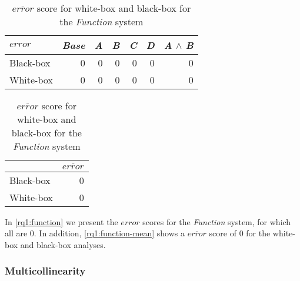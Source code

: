 \begin{table}[H]
    \begin{minipage}{.5\linewidth}
        \centering
        \begin{tabular}{lrrrrrr}    \toprule
        $error$     & \emph{Base} & \emph{A} & \emph{B} & \emph{C} & \emph{D} & \emph{A} $\land$ \emph{B}   \\ \midrule
        Black-box & 0 & 0 & 0 & 0 & 0 & 0      \\
        White-box & 0 & 0 & 0 & 0 & 0 & 0      \\ \bottomrule
        \end{tabular}
        \caption{Respective \emph{error} scores for white-box and black-box {\perfInfluenceModel}s for the \emph{Function} system.}
        \label{rq1:function}
    \end{minipage}%
    \hspace{7mm}
    \begin{minipage}{.37\linewidth}
        \centering
        \begin{tabular}{lr}
            \toprule
                      & $\overline{error}$   \\ \midrule
            Black-box & 0              \\
            White-box & 0              \\ \bottomrule
            \end{tabular}
            \caption{$\overline{error}$ score for white-box and black-box for the \emph{Function} system}
            \label{rq1:function-mean}
        \end{minipage}
    \end{table}

In \autoref{rq1:function} we present the $error$ scores for the \emph{Function} system, for which all are $0$. In addition, 
\autoref{rq1:function-mean} shows a $\overline{error}$ score of $0$ for the white-box and black-box analyses.
    
    \subsubsection*{Multicollinearity}

